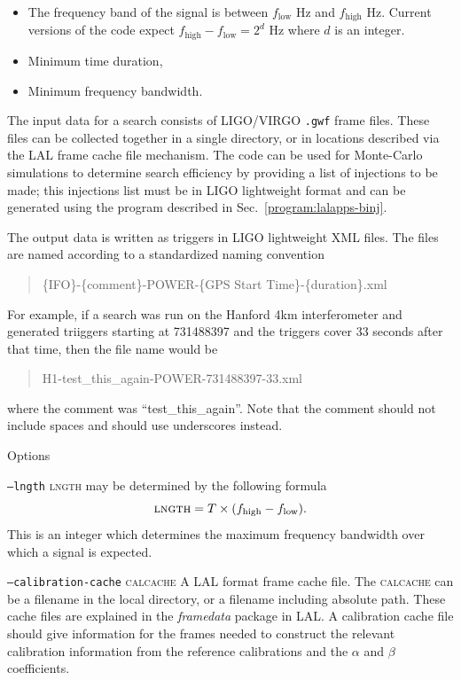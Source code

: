 \begin{entry}
\begin{itemize}
\item The frequency band of the signal is between $f_{\mathrm{low}}$ Hz and
${f_{\mathrm{high}}}$ Hz.  Current versions of the code expect
${f_{\mathrm{high}}}-{f_{\mathrm{low}}}=2^d$ Hz where $d$ is an integer. 

\item Minimum time duration,

\item Minimum frequency bandwidth.
\end{itemize}

The input data for a search consists of LIGO/VIRGO \texttt{.gwf} frame
files.  These files can be collected together in a single directory, or in
locations described via the LAL frame cache file mechanism.  The code can
be used for Monte-Carlo simulations to determine search efficiency by
providing a list of injections to be made;  this injections list must be in
LIGO lightweight format and can be generated using the 
program described in Sec.~\ref{program:lalapps-binj}. 

The output data is written as  triggers in LIGO
lightweight XML files.   The files are named according to a standardized
naming convention
\begin{quote}
\{IFO\}-\{comment\}-POWER-\{GPS Start Time\}-\{duration\}.xml
\end{quote}
For example, if a search was run on the Hanford 4km interferometer and
generated triiggers starting at 731488397 and the triggers cover 33 seconds
after that time,  then the file name would be 
\begin{quote}
H1-test\_this\_again-POWER-731488397-33.xml
\end{quote}
where the comment was ``test\_this\_again''.  Note that the comment should
not include spaces and should use underscores instead.

\item[Options]\leavevmode
\begin{entry}
\item[\option{--bandwidth} \parm{bandwidth}]
\item[\texttt{--lngth} \textsc{lngth}] may be determined by the following
formula
\[
\mbox{\textsc{lngth}} = T \times ({f_{\mathrm{high}} - f_{\mathrm{low}}}) .
\]
This is an integer which determines the maximum frequency bandwidth
over which a signal is expected.  

\item[\option{--calibration-cache} \parm{cache file}]
\item[\texttt{--calibration-cache} \textsc{calcache}] A LAL format frame
cache file.    The \textsc{calcache} can be a filename in the local
directory,  or a filename including absolute path.   These cache files are
explained in the \emph{framedata} package in LAL. A calibration cache file
should give information for the frames needed to construct the relevant
calibration information from the reference calibrations and the $\alpha$
and $\beta$ coefficients.   


\end{entry}
\end{entry}
